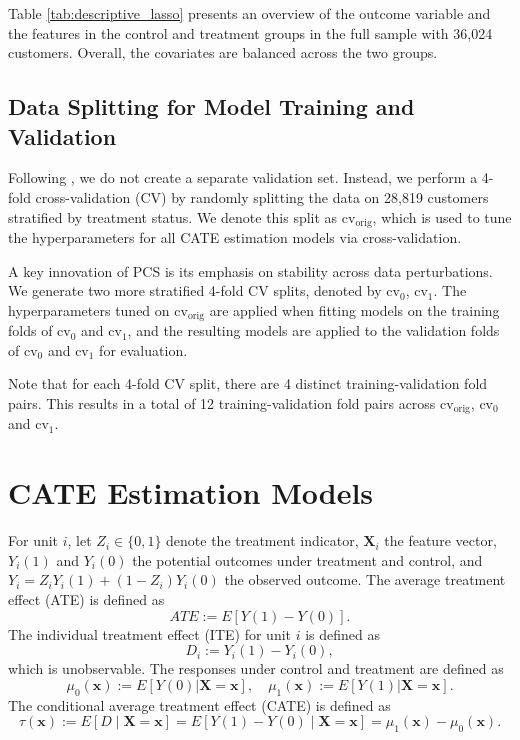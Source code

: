 \documentclass[12pt]{article}
\begin{document}
Table \ref{tab:descriptive_lasso} presents an overview of the outcome variable and the features in the control and treatment groups in the full sample with 36,024 customers. Overall, the covariates are balanced across the two groups.

\begingroup{}


\endgroup

\subsection{Data Splitting for Model Training and Validation}

Following \cite{dwivedi2020}, we do not create a separate validation set. Instead, we perform a 4-fold cross-validation (CV) by randomly splitting the data on 28,819 customers stratified by treatment status. We denote this split as $\text{cv}_\text{orig}$, which is used to tune the hyperparameters for all CATE estimation models via cross-validation.

A key innovation of PCS is its emphasis on stability across data perturbations. We generate two more stratified 4-fold CV splits, denoted by $\text{cv}_\text{0}$, $\text{cv}_\text{1}$. The hyperparameters tuned on $\text{cv}_{\text{orig}}$ are applied when fitting models on the training folds of $\text{cv}_\text{0}$ and $\text{cv}_\text{1}$, and the resulting models are applied to the validation folds of $\text{cv}_\text{0}$ and $\text{cv}_\text{1}$ for evaluation.

Note that for each 4-fold CV split, there are 4 distinct training-validation fold pairs. This results in a total of 12 training-validation fold pairs across $\text{cv}_\text{orig}$, $\text{cv}_\text{0}$ and $\text{cv}_\text{1}$.

\section{CATE Estimation Models}
\label{sec:cate_models}

For unit $i$, let $Z_i\in\{0,1\}$ denote the treatment indicator, $\bm{X}_i$ the feature vector, $Y_i(1)$ and $Y_i(0)$ the potential outcomes under treatment and control, and $Y_i=Z_iY_i(1)+(1-Z_i)Y_i(0)$ the observed outcome.
The average treatment effect (ATE) is defined as
\begin{equation*}
ATE:= E[Y(1)-Y(0)].
\end{equation*}
The individual treatment effect (ITE) for unit $i$ is defined as
\begin{equation*}
D_i:= Y_i(1) - Y_i(0),
\end{equation*}
which is unobservable.  The responses under control and treatment are defined as
\begin{equation*}
\mu_0(\bm{x}):=E[Y(0)|\bm{X}=\bm{x}],\quad \mu_1(\bm{x}):=E[Y(1)|\bm{X}=\bm{x}].
\end{equation*} The conditional average treatment effect (CATE) is defined as
\begin{equation*}
\tau(\bm{x}):= E[D \mid \bm{X} = \bm{x}] = E[Y(1) - Y(0) \mid \bm{X} = \bm{x}]=\mu_1(\bm{x})-\mu_0(\bm{x}).
\end{equation*}
\end{document}
